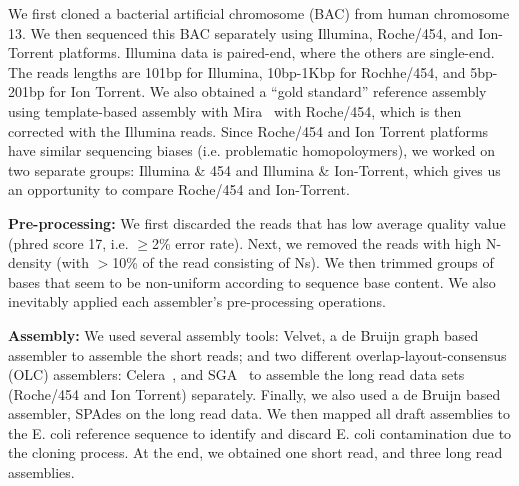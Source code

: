 \documentclass[12pt]{article}
\begin{document}
We first cloned a bacterial artificial chromosome (BAC) from human chromosome 13. We then sequenced this BAC separately using Illumina,  Roche/454, and Ion-Torrent platforms. Illumina data is paired-end, where the others are single-end. The reads lengths are 101bp for Illumina, 10bp-1Kbp for Rochhe/454,   and 5bp-201bp for Ion Torrent. We also obtained a ``gold standard'' reference assembly using 
template-based assembly with Mira~\cite{mira} with Roche/454, which is then corrected with the Illumina reads. Since Roche/454 and Ion Torrent platforms have similar sequencing biases (i.e. problematic homopoloymers), we worked on two separate groups: Illumina \& 454 and Illumina \& Ion-Torrent, which gives us an opportunity to compare Roche/454 and Ion-Torrent.

%
\textbf{Pre-processing:} We first discarded the reads that has low average quality value (phred score 17, i.e. $\geq$2\% error rate). Next, we removed the reads with high N-density (with $>$10\% of the read consisting of Ns). We then trimmed groups of bases that seem to be non-uniform according 
to sequence base content. We also inevitably applied each assembler's pre-processing operations.

\textbf{Assembly:} We used several assembly tools: Velvet\cite{velvetZerbino:2008}, a de Bruijn graph based assembler to assemble the short reads; and two different overlap-layout-consensus (OLC) assemblers: Celera~\cite{celera:2000}, and SGA~\cite{sga:2012} to assemble the long read data sets (Roche/454 and Ion Torrent) separately. Finally, we also used a de Bruijn based assembler, SPAdes\cite{spadesBankevich:2012} on the long read data. 
We then mapped all draft assemblies to the E. coli reference sequence to identify and discard E. coli contamination due to the cloning process. At the end,
 we obtained one short read, and three long read assemblies.
\end{document}
